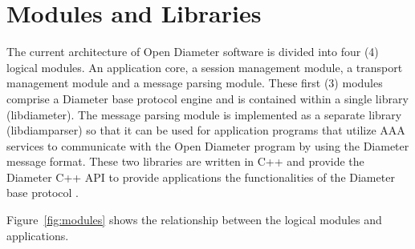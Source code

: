 \documentclass{article}
\begin{document}

\section{Modules and Libraries\label{sec:modules}}

The current architecture of Open Diameter software is divided into four
(4) logical modules. An application core, a session management module, a
transport management module and a message parsing module. These first
(3) modules comprise a Diameter base protocol engine and is contained
within a single library (libdiameter). The message parsing module is
implemented as a separate library (libdiamparser) so that it can be used
for application programs that utilize AAA services to communicate with
the Open Diameter program by using the Diameter message format.
These two libraries are written in C++ and provide the Diameter C++ API
\cite{api} to provide applications the functionalities of the Diameter
base protocol \cite{basep}.

Figure~\ref{fig:modules} shows the relationship between the logical
modules and applications.


\begin{figure}[htbp]
\end{figure}
\end{document}
